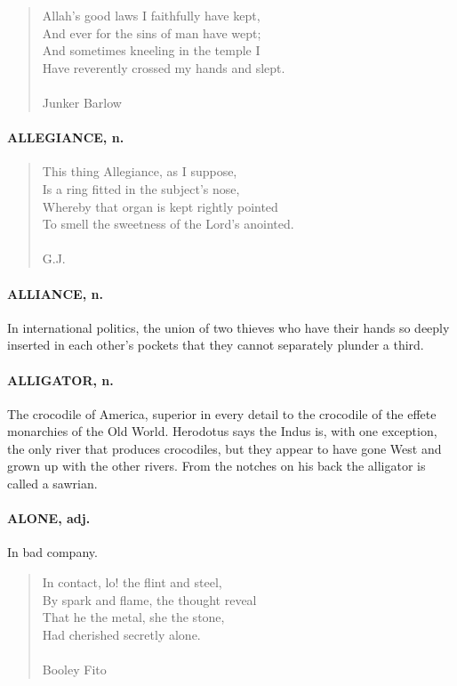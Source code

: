 \documentclass[11pt]{article}
\begin{document}
\begin{quote}   Allah's good laws I faithfully have kept, \\
  And ever for the sins of man have wept; \\
      And sometimes kneeling in the temple I \\
  Have reverently crossed my hands and slept. \\
 \\
Junker Barlow \end{quote}


\paragraph{ALLEGIANCE, n.}

\begin{quote}   This thing Allegiance, as I suppose, \\
  Is a ring fitted in the subject's nose, \\
  Whereby that organ is kept rightly pointed \\
  To smell the sweetness of the Lord's anointed. \\
 \\
G.J. \end{quote}


\paragraph{ALLIANCE, n.}  In international politics, the union of two thieves who
have their hands so deeply inserted in each other's pockets that they
cannot separately plunder a third.

\paragraph{ALLIGATOR, n.}  The crocodile of America, superior in every detail to
the crocodile of the effete monarchies of the Old World.  Herodotus
says the Indus is, with one exception, the only river that produces
crocodiles, but they appear to have gone West and grown up with the
other rivers.  From the notches on his back the alligator is called a
sawrian.

\paragraph{ALONE, adj.}  In bad company.

\begin{quote}   In contact, lo! the flint and steel, \\
  By spark and flame, the thought reveal \\
  That he the metal, she the stone, \\
  Had cherished secretly alone. \\
 \\
Booley Fito \end{quote}
\end{document}
